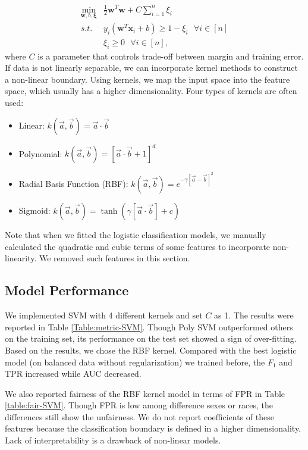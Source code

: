 \vspace{-15pt}
\begin{align*}
\min_{\mathbf{w},b,\mathbf{\xi}} & \frac{1}{2} \mathbf{w}^T \mathbf{w} + C \sum_{i=1}^n \xi_i \\
s.t.~~&  y_i(\mathbf{w}^T \mathbf{x}_i + b) \ge 1 - \xi_i ~~~\forall i \in [n] \\
& \xi_i \ge 0 ~~~ \forall i \in [n],
\end{align*}
where $C$ is a parameter that controls trade-off between margin and training error. 
If data is not linearly separable, we can incorporate kernel methods to construct a non-linear boundary. Using kernels, we map the input space into the feature space, which usually has a higher dimensionality. Four types of kernels are often used:
\begin{itemize}
\item Linear: $k(\vec{a},\vec{b}) = \vec{a} \cdot \vec{b}$
\item Polynomial: $k(\vec{a},\vec{b}) = [ \vec{a} \cdot \vec{b} + 1]^d $
\item Radial Basis Function (RBF): $k(\vec{a},\vec{b}) = e^{-\gamma [\vec{a}-\vec{b}]^2}$
\item Sigmoid: $k(\vec{a},\vec{b}) = \tanh(\gamma [\vec{a} \cdot \vec{b}]+c)$
\end{itemize}

Note that when we fitted the logistic classification models, we manually calculated the quadratic and cubic terms of some features to incorporate non-linearity. We removed such features in this section.

\subsection{Model Performance}

We implemented SVM with 4 different kernels and set $C$ as 1. The results were reported in Table \ref{Table:metric-SVM}. Though Poly SVM outperformed others on the training set, its performance on the test set showed a sign of over-fitting. Based on the results, we chose the RBF kernel. Compared with the best logistic model (on balanced data without regularization) we trained before, the $F_1$ and TPR increased while AUC decreased.

We also reported fairness of the RBF kernel model in terms of FPR in Table \ref{table:fair-SVM}. Though FPR is low among difference sexes or races, the differences still show the unfairness. We do not report coefficients of these features because the classification boundary is defined in a higher dimensionality. Lack of interpretability is a drawback of non-linear models.

